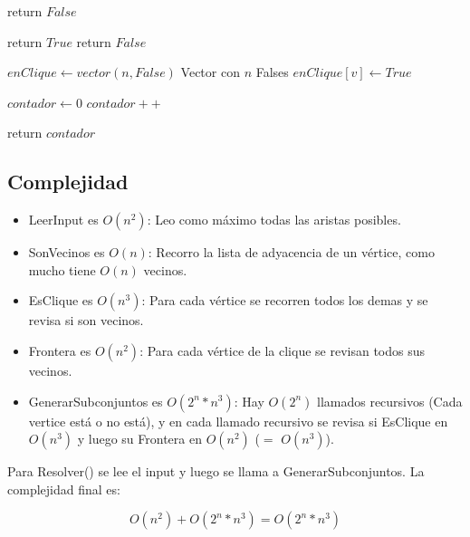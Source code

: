 \begin{algorithm}[H]
\begin{algorithmic}
                \State return $False$
            \EndIf
        \EndFor
    \EndFor
\EndFunction
\end{algorithmic}
\end{algorithm}

\begin{algorithm}[H]
\begin{algorithmic}
            \State return $True$
        \EndIf
    \EndFor
    \State return $False$

\EndFunction
\end{algorithmic}
\end{algorithm}

\begin{algorithm}[H]
\begin{algorithmic}
    \State $enClique \gets vector(n, False)$ \Comment Vector con $n$ Falses
        \State $enClique[v] \gets True$
    \EndFor

    \State $contador \gets 0$
                \State $contador++$
            \EndIf
        \EndFor
    \EndFor

    \State return $contador$

\EndFunction
\end{algorithmic}
\end{algorithm}

\subsection{Complejidad}

\begin{itemize}
    \item LeerInput es $O(n^2)$: Leo como máximo todas las aristas posibles.
    \item SonVecinos es $O(n)$: Recorro la lista de adyacencia de un vértice, como mucho tiene $O(n)$ vecinos.
    \item EsClique es $O(n^{3})$: Para cada vértice se recorren todos los demas y se revisa si son vecinos.
    \item Frontera es $O(n^{2})$: Para cada vértice de la clique se revisan todos sus vecinos.
    \item GenerarSubconjuntos es $O(2^{n} * n^{3})$: Hay $O(2^n)$ llamados recursivos (Cada vertice está o no está), y en cada llamado recursivo se revisa si EsClique en $O(n^3)$ y luego su Frontera en $O(n^2)$ ($=$ $O(n^3)$).
\end{itemize}

Para Resolver() se lee el input y luego se llama a GenerarSubconjuntos. La complejidad final es:

$$ O(n^2) + O(2^{n} * n^{3}) = O(2^{n} * n^{3})$$
